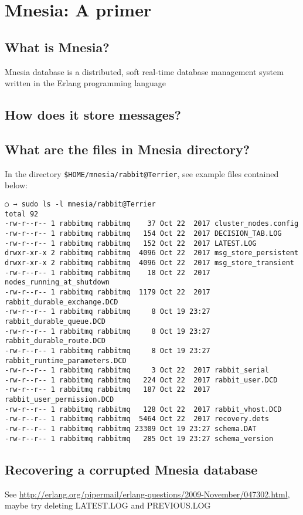 \section{Mnesia: A primer}
	\subsection{What is Mnesia?}
Mnesia database is a distributed, soft real-time database management system written in the Erlang programming language

	\subsection{How does it store messages?}



	\subsection{What are the files in Mnesia directory?}
	In the directory \verb+$HOME/mnesia/rabbit@Terrier+, see example files contained below:
	\begin{verbatim}
○ → sudo ls -l mnesia/rabbit@Terrier
total 92
-rw-r--r-- 1 rabbitmq rabbitmq    37 Oct 22  2017 cluster_nodes.config
-rw-r--r-- 1 rabbitmq rabbitmq   154 Oct 22  2017 DECISION_TAB.LOG
-rw-r--r-- 1 rabbitmq rabbitmq   152 Oct 22  2017 LATEST.LOG
drwxr-xr-x 2 rabbitmq rabbitmq  4096 Oct 22  2017 msg_store_persistent
drwxr-xr-x 2 rabbitmq rabbitmq  4096 Oct 22  2017 msg_store_transient
-rw-r--r-- 1 rabbitmq rabbitmq    18 Oct 22  2017 nodes_running_at_shutdown
-rw-r--r-- 1 rabbitmq rabbitmq  1179 Oct 22  2017 rabbit_durable_exchange.DCD
-rw-r--r-- 1 rabbitmq rabbitmq     8 Oct 19 23:27 rabbit_durable_queue.DCD
-rw-r--r-- 1 rabbitmq rabbitmq     8 Oct 19 23:27 rabbit_durable_route.DCD
-rw-r--r-- 1 rabbitmq rabbitmq     8 Oct 19 23:27 rabbit_runtime_parameters.DCD
-rw-r--r-- 1 rabbitmq rabbitmq     3 Oct 22  2017 rabbit_serial
-rw-r--r-- 1 rabbitmq rabbitmq   224 Oct 22  2017 rabbit_user.DCD
-rw-r--r-- 1 rabbitmq rabbitmq   187 Oct 22  2017 rabbit_user_permission.DCD
-rw-r--r-- 1 rabbitmq rabbitmq   128 Oct 22  2017 rabbit_vhost.DCD
-rw-r--r-- 1 rabbitmq rabbitmq  5464 Oct 22  2017 recovery.dets
-rw-r--r-- 1 rabbitmq rabbitmq 23309 Oct 19 23:27 schema.DAT
-rw-r--r-- 1 rabbitmq rabbitmq   285 Oct 19 23:27 schema_version
\end{verbatim}


	\subsection{Recovering a corrupted Mnesia database}
	See \url{http://erlang.org/pipermail/erlang-questions/2009-November/047302.html}, maybe try deleting LATEST.LOG and PREVIOUS.LOG